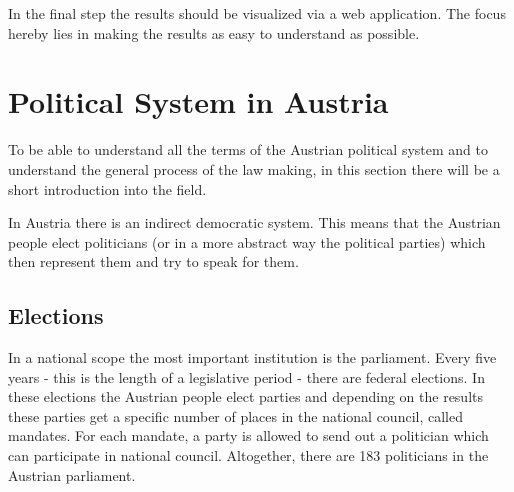 In the final step the results should be visualized via a web application. The focus hereby lies in making the results as easy to understand as possible.

\section{Political System in Austria}
To be able to understand all the terms of the Austrian political system and to understand the general process of the law making, in this section there will be a short introduction into the field.

In Austria there is an indirect democratic system. This means that the Austrian people elect politicians (or in a more abstract way the political parties) which then represent them and try to speak for them.

\subsection{Elections}
In a national scope the most important institution is the parliament. Every five years - this is the length of a legislative period - there are federal elections. In these elections the Austrian people elect parties and depending on the results these parties get a specific number of places in the national council, called mandates. For each mandate, a party is allowed to send out a politician which can participate in national council. Altogether, there are 183 politicians in the Austrian parliament.

